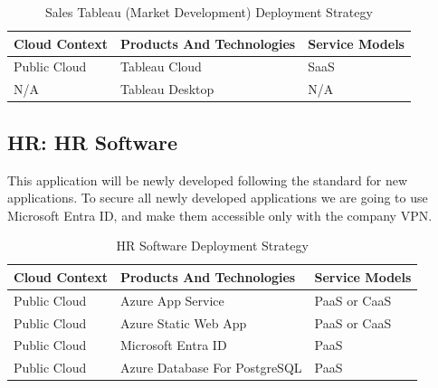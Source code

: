 \documentclass{llncs}
\begin{document}
\begin{table}[h!]
    \centering
    \begin{tabular}{lll}
        \hline
        \textbf{Cloud Context} & \textbf{Products And Technologies} & \textbf{Service Models} \\
        \hline
        Public Cloud           & Tableau Cloud                      & SaaS                    \\
        N/A                    & Tableau Desktop                    & N/A                     \\
    \end{tabular}
    \caption{Sales Tableau (Market Development) Deployment Strategy}
\end{table}

\subsection{HR: HR Software}
This application will be newly developed following the standard for new applications.
To secure all newly developed applications we are going to use Microsoft Entra ID, and make them accessible only with the company VPN.\\

\begin{table}[h!]
    \centering
    \begin{tabular}{lll}
        \hline
        \textbf{Cloud Context} & \textbf{Products And Technologies} & \textbf{Service Models} \\
        \hline
        Public Cloud           & Azure App Service                  & PaaS or CaaS            \\
        \hline
        Public Cloud           & Azure Static Web App               & PaaS or CaaS            \\

        \hline
        Public Cloud           & Microsoft Entra ID                 & PaaS                    \\
        \hline
        Public Cloud           & Azure Database For PostgreSQL      & PaaS                    \\
        \hline
    \end{tabular}
    \caption{HR Software Deployment Strategy}
\end{table}
\end{document}
